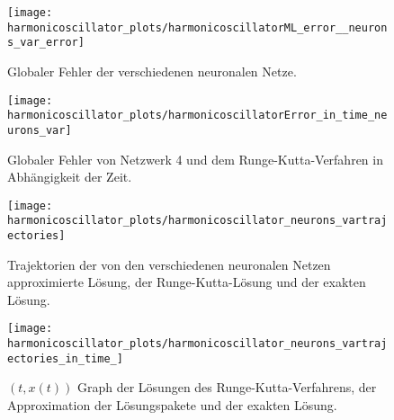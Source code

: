\begin{figure}
       \centering
       \texttt{[image: harmonicoscillator\_plots/harmonicoscillatorML\_error\_\_neurons\_var\_error]}
       \caption{Globaler Fehler der verschiedenen neuronalen Netze.}
       \label{fig:harmonic-neurons-variable-error}
\end{figure}
\begin{figure}
       \centering
       \texttt{[image: harmonicoscillator\_plots/harmonicoscillatorError\_in\_time\_neurons\_var]}
       \caption{Globaler Fehler von Netzwerk 4 und dem Runge-Kutta-Verfahren in Abhängigkeit der Zeit.}
       \label{fig:harmonic-neurons-variable-error-in-time}
\end{figure}
\begin{figure}
       \centering
       \texttt{[image: harmonicoscillator\_plots/harmonicoscillator\_neurons\_vartrajectories]}
       \caption{Trajektorien der von den verschiedenen neuronalen Netzen approximierte Lösung, der Runge-Kutta-Lösung
       und der exakten Lösung.}
       \label{fig:harmonic-neurons-variable-trajectories}
\end{figure}
\begin{figure}
       \centering
       \texttt{[image: harmonicoscillator\_plots/harmonicoscillator\_neurons\_vartrajectories\_in\_time\_]}
       \caption{$(t,x(t))$ Graph der Lösungen des Runge-Kutta-Verfahrens, der Approximation der
       Lösungspakete und der exakten Lösung.}
       \label{fig:harmonic-neurons-variable-trajectories-in-time}
\end{figure}

